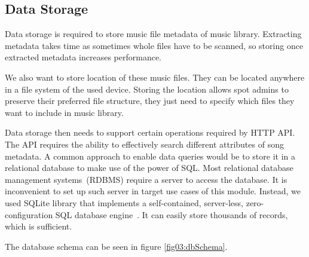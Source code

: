 \subsection{Data Storage}

Data storage is required to store music file metadata of music library. Extracting metadata takes time as sometimes whole files have to be scanned, so storing once extracted metadata increases performance. 
\par
We also want to store location of these music files. They can be located anywhere in a file system of the used device. Storing the location allows spot admins to preserve their preferred file structure, they just need to specify which files they want to include in music library.
\par
Data storage then needs to support certain operations required by HTTP API. The API requires the ability to effectively search different attributes of song metadata. A common approach to enable data queries would be to store it in a relational database to make use of the power of SQL. Most relational database management systems~(RDBMS) require a server to access the database. It is inconvenient to set up such server in target use cases of this module. Instead, we used SQLite library that implements a self-contained, server-less, zero-configuration SQL database engine~\citep{sqlite}. It can easily store thousands of records, which is sufficient.
\par
The database schema can be seen in figure \ref{fig03:dbSchema}.
